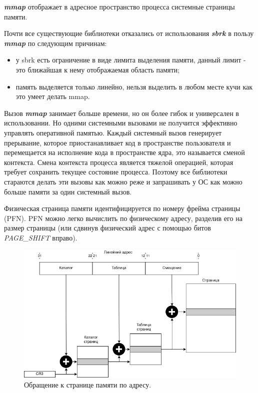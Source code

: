 \textbf{\textit{mmap}} отображает в адресное пространство процесса системные страницы памяти.

Почти все существующие библиотеки отказались от использования \textbf{\textit{sbrk}} в пользу \textbf{\textit{mmap}} по следующим причинам:
\begin{itemize}
	\item у sbrk есть ограничение в виде лимита выделения памяти, данный лимит - это ближайшая к нему отображаемая область памяти;
	\item память выделяется только линейно, нельзя выделить в любом месте кучи как это умеет делать mmap.
\end{itemize}

Вызов \textbf{\textit{mmap}} занимает больше времени, но он более гибок и универсален в использовании. Но одними системными вызовами не получится эффективно управлять оперативной памятью. Каждый системный вызов генерирует прерывание, которое приостанавливает код в пространстве пользователя и перемещается   на исполнение кода в пространстве  ядра, это называется сменой контекста. Смена контекста процесса является тяжелой операцией, которая требует сохранить текущее состояние процесса. Поэтому все библиотеки стараются делать эти вызовы как можно реже и запрашивать у ОС как можно больше памяти за один системный вызов.

Физическая страница памяти идентифицируется по номеру фрейма страницы (PFN)\cite{page-frame}. PFN можно легко вычислить по физическому адресу, разделив его на размер страницы (или сдвинув физический адрес с помощью битов \textit{PAGE\_SHIFT} вправо).

\begin{figure}[!h]
	\begin{center}
		\includegraphics[scale=0.6]{images/memory-mapping.png}
		\caption{Обращение к странице памяти по адресу.}
		\label{memory-mapping}
	\end{center}
\end{figure}

